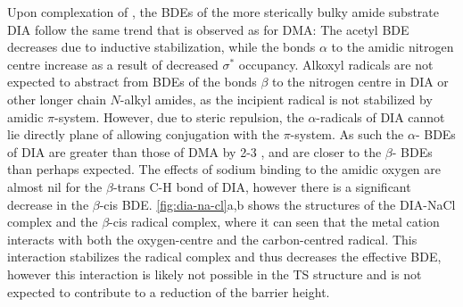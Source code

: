 \begin{doublespace}
Upon complexation of , the BDEs of the more sterically bulky amide
substrate DIA follow the same trend that is observed as for DMA: The acetyl
 BDE decreases due to inductive stabilization, while the  bonds
$\alpha$ to the amidic nitrogen centre increase as a result of decreased
 $\sigma^*$ occupancy. Alkoxyl radicals are not expected to abstract
from  BDEs of the bonds $\beta$ to the nitrogen centre in DIA or other
longer chain $N$-alkyl amides, as the incipient radical is not stabilized by
amidic $\pi$-system. However, due to steric repulsion, the $\alpha$-radicals of
DIA cannot lie directly plane of allowing conjugation with the $\pi$-system. As
such the $\alpha$- BDEs of DIA are greater than those of DMA by 2-3
\kcalmol, and are closer to the $\beta$- BDEs than perhaps expected. The
effects of sodium binding to the amidic oxygen are almost nil for the
$\beta$-trans C-H bond of DIA, however there is a significant decrease in the
$\beta$-cis  BDE. \ref{fig:dia-na-cl}a,b shows the structures of the
DIA-NaCl complex and the $\beta$-cis radical complex, where it can seen that the
metal cation interacts with both the oxygen-centre and the carbon-centred
radical. This interaction stabilizes the radical complex and thus decreases the
effective BDE, however this interaction is likely not possible in the TS
structure and is not expected to contribute to a reduction of the barrier
height.

\begin{figure}[!htbp]
	\centering



\end{figure}
\end{doublespace}
